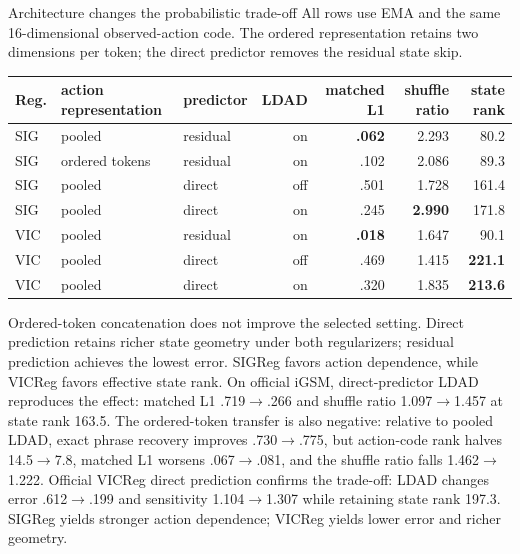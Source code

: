 \documentclass[aspectratio=169,10pt]{beamer}
\newcommand{\good}[1]{\textcolor{cgreen}{\textbf{#1}}}
\begin{document}
\begin{frame}{Architecture changes the probabilistic trade-off}
\scriptsize
All rows use EMA and the same 16-dimensional observed-action code. The ordered
representation retains two dimensions per token; the direct predictor removes
the residual state skip.

\medskip
\centering
\begin{tabular}{lllrrrr}
\toprule
Reg. & action representation & predictor & LDAD & matched L1 & shuffle ratio & state rank\\
\midrule
SIG & pooled & residual & on & \good{.062} & 2.293 & 80.2\\
SIG & ordered tokens & residual & on & .102 & 2.086 & 89.3\\
SIG & pooled & direct & off & .501 & 1.728 & 161.4\\
SIG & pooled & direct & on & .245 & \good{2.990} & 171.8\\
VIC & pooled & residual & on & \good{.018} & 1.647 & 90.1\\
VIC & pooled & direct & off & .469 & 1.415 & \good{221.1}\\
VIC & pooled & direct & on & .320 & 1.835 & \good{213.6}\\
\bottomrule
\end{tabular}

\medskip
Ordered-token concatenation does not improve the selected setting. Direct
prediction retains richer state geometry under both regularizers; residual
prediction achieves the lowest error. SIGReg favors action dependence, while
VICReg favors effective state rank. On official iGSM, direct-predictor LDAD
reproduces the effect: matched L1 .719$\rightarrow$.266 and shuffle ratio
1.097$\rightarrow$1.457 at state rank 163.5. The ordered-token transfer is
also negative: relative to pooled LDAD, exact phrase recovery improves
.730$\rightarrow$.775, but action-code rank halves 14.5$\rightarrow$7.8,
matched L1 worsens .067$\rightarrow$.081, and the shuffle ratio falls
1.462$\rightarrow$1.222. Official VICReg direct prediction confirms the
trade-off: LDAD changes error .612$\rightarrow$.199 and sensitivity
1.104$\rightarrow$1.307 while retaining state rank 197.3. SIGReg yields
stronger action dependence; VICReg yields lower error and richer geometry.
\end{frame}
\end{document}
